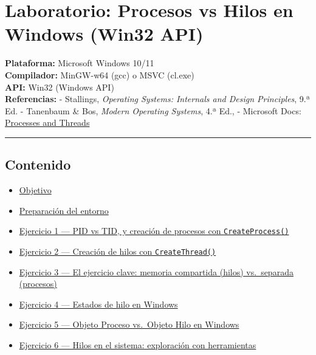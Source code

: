 \documentclass[
  spanish,
]{article}
\author{}
\date{}
\providecommand{\tightlist}{%
  \setlength{\itemsep}{0pt}\setlength{\parskip}{0pt}}
\begin{document}
{
\setcounter{tocdepth}{3}
\tableofcontents
}
\section{Laboratorio: Procesos vs Hilos en Windows (Win32
API)}\label{laboratorio-procesos-vs-hilos-en-windows-win32-api}

\textbf{Plataforma:} Microsoft Windows 10/11\\
\textbf{Compilador:} MinGW-w64 (gcc) o MSVC (cl.exe)\\
\textbf{API:} Win32 (Windows API)\\
\textbf{Referencias:} - Stallings, \emph{Operating Systems: Internals
and Design Principles}, 9.ª Ed. - Tanenbaum \& Bos, \emph{Modern
Operating Systems}, 4.ª Ed., - Microsoft Docs:
\href{https://docs.microsoft.com/en-us/windows/win32/procthread/processes-and-threads}{Processes
and Threads}

\begin{center}\rule{0.5\linewidth}{0.5pt}\end{center}

\subsection{Contenido}\label{contenido}

\begin{itemize}
\tightlist
\item
  \hyperref[objetivo]{Objetivo}
\item
  \hyperref[preparaciuxf3n-del-entorno]{Preparación del entorno}
\item
  \hyperref[ejercicio-1--pid-vs-tid-y-creaciuxf3n-de-procesos-con-createprocess]{Ejercicio
  1 --- PID vs TID, y creación de procesos con \texttt{CreateProcess()}}
\item
  \hyperref[ejercicio-2--creaciuxf3n-de-hilos-con-createthread]{Ejercicio
  2 --- Creación de hilos con \texttt{CreateThread()}}
\item
  \hyperref[ejercicio-3--el-ejercicio-clave-memoria-compartida-hilos-vs-separada-procesos]{Ejercicio
  3 --- El ejercicio clave: memoria compartida (hilos) vs.~separada
  (procesos)}
\item
  \hyperref[ejercicio-4--estados-de-hilo-en-windows]{Ejercicio 4 ---
  Estados de hilo en Windows}
\item
  \hyperref[ejercicio-5--objeto-proceso-vs-objeto-hilo-en-windows]{Ejercicio
  5 --- Objeto Proceso vs.~Objeto Hilo en Windows}
\item
  \hyperref[ejercicio-6--hilos-en-el-sistema-exploraciuxf3n-con-herramientas]{Ejercicio
  6 --- Hilos en el sistema: exploración con herramientas}
\end{itemize}
\end{document}

